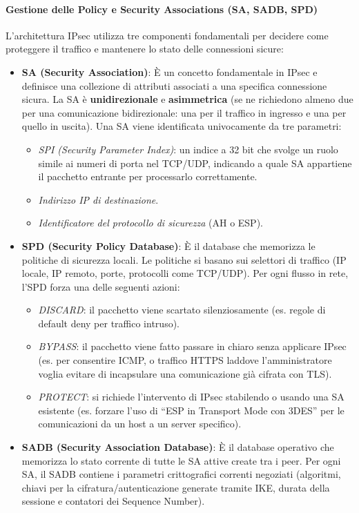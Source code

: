 \documentclass{article}
\begin{document}
\paragraph{Gestione delle Policy e Security Associations (SA, SADB, SPD)}
L'architettura IPsec utilizza tre componenti fondamentali per decidere come proteggere il traffico e mantenere lo stato delle connessioni sicure:
\begin{itemize}
    \item \textbf{SA (Security Association)}: È un concetto fondamentale in IPsec e definisce una collezione di attributi associati a una specifica connessione sicura. La SA è \textbf{unidirezionale} e \textbf{asimmetrica} (se ne richiedono almeno due per una comunicazione bidirezionale: una per il traffico in ingresso e una per quello in uscita). Una SA viene identificata univocamente da tre parametri:
    \begin{itemize}
        \item \emph{SPI (Security Parameter Index)}: un indice a 32 bit che svolge un ruolo simile ai numeri di porta nel TCP/UDP, indicando a quale SA appartiene il pacchetto entrante per processarlo correttamente.
        \item \emph{Indirizzo IP di destinazione}.
        \item \emph{Identificatore del protocollo di sicurezza} (AH o ESP).
    \end{itemize}
    \item \textbf{SPD (Security Policy Database)}: È il database che memorizza le politiche di sicurezza locali. Le politiche si basano sui selettori di traffico (IP locale, IP remoto, porte, protocolli come TCP/UDP). Per ogni flusso in rete, l'SPD forza una delle seguenti azioni:
    \begin{itemize}
        \item \emph{DISCARD}: il pacchetto viene scartato silenziosamente (es. regole di default deny per traffico intruso).
        \item \emph{BYPASS}: il pacchetto viene fatto passare in chiaro senza applicare IPsec (es. per consentire ICMP, o traffico HTTPS laddove l'amministratore voglia evitare di incapsulare una comunicazione già cifrata con TLS).
        \item \emph{PROTECT}: si richiede l'intervento di IPsec stabilendo o usando una SA esistente (es. forzare l'uso di ``ESP in Transport Mode con 3DES'' per le comunicazioni da un host a un server specifico).
    \end{itemize}
    \item \textbf{SADB (Security Association Database)}: È il database operativo che memorizza lo stato corrente di tutte le SA attive create tra i peer. Per ogni SA, il SADB contiene i parametri crittografici correnti negoziati (algoritmi, chiavi per la cifratura/autenticazione generate tramite IKE, durata della sessione e contatori dei Sequence Number).
\end{itemize}
\end{document}
